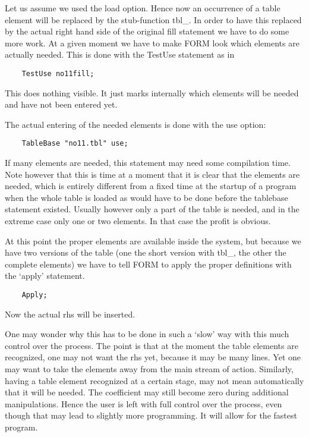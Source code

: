 Let us assume we used the load option. Hence now an occurrence of a table 
element will be replaced by the stub-function 
tbl\_. In order to have this replaced by the actual right hand 
side of the original fill statement we have to do some more work. At a 
given moment we have to make FORM look which elements are actually needed. 
This is done with the TestUse statement as in
\begin{verbatim}
    TestUse no11fill;
\end{verbatim}
This does nothing visible. It just marks internally which elements will be 
needed and have not been entered yet.

The actual entering of the needed elements is done with the use 
option:\begin{verbatim}
    TableBase "no11.tbl" use;
\end{verbatim}
If many elements are needed, this statement may need some compilation time. 
Note however that this is time at a moment that it is clear that the 
elements are needed, which is entirely different from a fixed time at the 
startup of a program when the whole table is loaded as would have to be 
done before the tablebase statement existed. Usually however only a 
part of the table is needed, and in the extreme case only one or two 
elements. In that case the profit is obvious.

At this point the proper elements are available inside the system, but 
because we have two versions of the table (one the short version with 
tbl\_, the other the complete elements) we have to tell FORM to apply 
the proper definitions with the `apply' statement.
\begin{verbatim}
    Apply;
\end{verbatim}
Now the actual rhs will be inserted.

One may wonder why this has to be done in such a `slow' way with this much 
control over the process. The point is that at the moment the table 
elements are recognized, one may not want the rhs yet, because it may be 
many lines. Yet one may want to take the elements away from the main stream 
of action. Similarly, having a table element recognized at a certain stage, 
may not mean automatically that it will be needed. The coefficient may 
still become zero during additional manipulations. Hence the user is left 
with full control over the process, even though that may lead to slightly 
more programming. It will allow for the fastest program.

